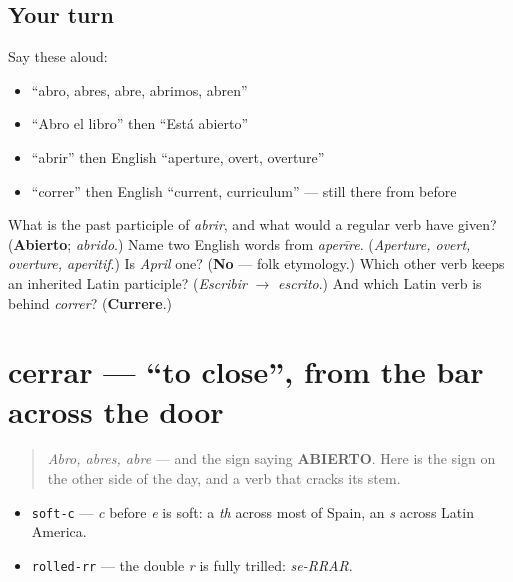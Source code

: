 \subsection*{Your turn}
Say these aloud:

\begin{itemize}
\raggedright
  \item \textquotedblleft{}abro, abres, abre, abrimos, abren\textquotedblright{}
  \item \textquotedblleft{}Abro el libro\textquotedblright{} then \textquotedblleft{}Está abierto\textquotedblright{}
  \item \textquotedblleft{}abrir\textquotedblright{} then English \textquotedblleft{}aperture, overt, overture\textquotedblright{}
  \item \textquotedblleft{}correr\textquotedblright{} then English \textquotedblleft{}current, curriculum\textquotedblright{} — still there from before
\end{itemize}

\begin{tcolorbox}[breakable,colback=teal!4,colframe=teal!35!black,title={Before you move on}]
What is the past participle of \emph{abrir}, and what would a regular verb have given? (\textbf{Abierto}; \emph{abrido}.) Name two English words from \emph{aperīre}. (\emph{Aperture, overt, overture, aperitif}.) Is \emph{April} one? (\textbf{No} — folk etymology.) Which other verb keeps an inherited Latin participle? (\emph{Escribir} $\to$ \emph{escrito}.) And which Latin verb is behind \emph{correr}? (\textbf{Currere}.)
\end{tcolorbox}
\section[cerrar]{cerrar — \textquotedblleft{}to close\textquotedblright{}, from the bar across the door}

\label{lesson:ES-C37-cerrar}



\begin{quote}
\emph{Abro, abres, abre} — and the sign saying \textbf{ABIERTO}. Here is the sign on the other side of the day, and a verb that cracks its stem.
\end{quote}

\begin{sounds}
\begin{itemize}
\raggedright
  \item \texttt{soft-c} — \emph{c} before \emph{e} is soft: a \emph{th} across most of Spain, an \emph{s} across Latin America.
  \item \texttt{rolled-rr} — the double \emph{r} is fully trilled: \emph{se-RRAR}.
\end{itemize}
\end{sounds}

